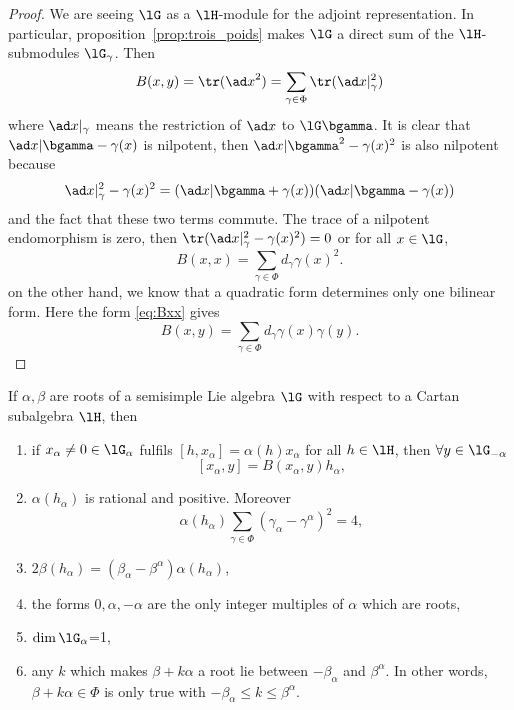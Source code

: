 \begin{proof}
    We are seeing $\lG$ as a $\lH$-module for the adjoint representation. In particular, proposition~\ref{prop:trois_poids} makes $\lG$ a direct sum of the $\lH$-submodules $\lG_{\gamma}$. Then
    \begin{equation}
    B(x,y)=\tr({\ad x}^2)\\
            =\sum_{\gamma\in\Phi}\tr(\ad x|_{\gamma}^2)
    \end{equation}
    where $\ad x|_{\gamma}$ means the restriction of $\ad x$ to $\lG\bgamma$. It is clear that $\ad x|\bgamma-\gamma(x)$ is nilpotent, then $\ad x|\bgamma^2-\gamma(x)^2$ is also nilpotent because
    \[
    \ad x|_{\gamma}^2-\gamma(x)^2=(\ad x|\bgamma+\gamma(x))(\ad x|\bgamma-\gamma(x))
    \]
    and the fact that these two terms commute. The trace of a nilpotent endomorphism is zero, then $\tr(\ad x|_{\gamma}^2-\gamma(x)^2)=0$ or for all $x\in\lG$,
    \begin{equation}\label{eq:Bxx}
    B(x,x)=\sum_{\gamma\in\Phi}d_{\gamma}\gamma(x)^2.
    \end{equation}
    on the other hand, we know that a quadratic form determines only one bilinear form. Here the form \eqref{eq:Bxx} gives
    \[
    B(x,y)=\sum_{\gamma\in\Phi}d_{\gamma}\gamma(x)\gamma(y).
    \]
\end{proof}

\begin{theorem}\label{tho:six_Cartan}
    If $\alpha,\beta$ are roots of a semisimple Lie algebra $\lG$ with respect to a Cartan subalgebra $\lH$, then
    \begin{enumerate}
        \item if $x_{\alpha}\neq0\in\lG_{\alpha}$ fulfils $[h,x_{\alpha}]=\alpha(h)x_{\alpha}$ for all $h\in\lH$, then $\forall y\in\lG_{-\alpha}$
        \[
        [x_{\alpha},y]=B(x_{\alpha},y)h_{\alpha},
        \]
        \item\label{ite:six_deux} $\alpha(h_{\alpha})$ is rational and positive. Moreover
        \[
        \alpha(h_{\alpha})\sum_{\gamma\in\Phi}(\gamma_{\alpha}-\gamma^{\alpha})^2=4,
        \]
        \item $2\beta(h_{\alpha})=(\beta_{\alpha}-\beta^{\alpha})\alpha(h_{\alpha})$,
        \label{ite:six_trois}
        \item the forms $0,\alpha,-\alpha$ are the only integer multiples of $\alpha$ which are roots,
        \label{ite:six_quatre}
        \item $\dim\lG_{\alpha}$=1,
        \label{ite:six_cinq}
        \item any $k$ which makes $\beta+k\alpha$ a root lie between $-\beta_{\alpha}$ and $\beta^{\alpha}$. In other words, $\beta+k\alpha\in\Phi$ is only true with $-\beta_{\alpha}\leq k\leq\beta^{\alpha}$.
        \label{ite:six_six}
    \end{enumerate}

\end{theorem}

